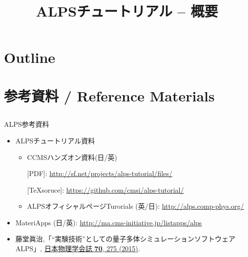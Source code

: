 
\title{ALPSチュートリアル -- 概要}




\begin{frame}
  \titlepage
\end{frame}

\section*{Outline}
\begin{frame}[t,fragile]
  \tableofcontents
\end{frame}

\section{参考資料 / Reference Materials}

\subsection*{\redb\whiteb\greenb}
\begin{frame}[t,fragile]{ALPS参考資料}
  \begin{itemize}
    \setlength{\itemsep}{1em}
  \item ALPSチュートリアル資料
    \begin{itemize}
    \item CCMSハンズオン資料(日/英)
      
      [PDF]: {\footnotesize \url{http://sf.net/projects/alps-tutorial/files/}}
      
      [\TeX soruce]: {\footnotesize \url{https://github.com/cmsi/alps-tutorial/}}
      
     \item ALPSオフィシャルページTurorials (英/日): {\footnotesize \url{http://alps.comp-phys.org/}}
    \end{itemize}
  \item MateriApps (日/英): {\footnotesize \url{http://ma.cms-initiative.jp/listapps/alps}}
  \item 藤堂眞治,「``実験技術''としての量子多体シミュレーションソフトウェアALPS」, \href{http://www.jps.or.jp/books/gakkaishi/2015/04/06/70-04exp.pdf}{日本物理学会誌 {\bf 70}, 275 (2015)}.
  \end{itemize}
\end{frame}

